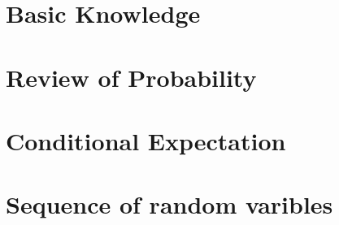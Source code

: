 \documentclass[12pt]{article}
\begin{document}

\chapter{Basic Knowledge}


\chapter{Review of Probability}




\chapter{Conditional Expectation}




\chapter{Sequence of random varibles}

\end{document}
